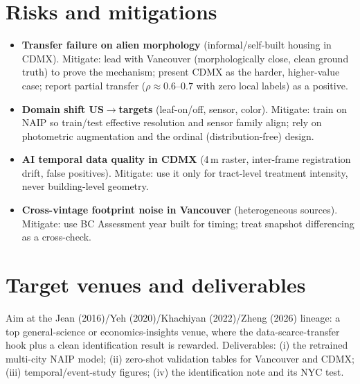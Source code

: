 \documentclass[11pt]{article}
\theoremstyle{plain}
\theoremstyle{remark}
\begin{document}
\section{Risks and mitigations}
\begin{itemize}[leftmargin=1.4em,itemsep=0.15em]
\item \textbf{Transfer failure on alien morphology} (informal/self-built housing in
CDMX). Mitigate: lead with Vancouver (morphologically close, clean ground truth) to
prove the mechanism; present CDMX as the harder, higher-value case; report partial
transfer ($\rho\!\approx\!0.6$--$0.7$ with zero local labels) as a positive.
\item \textbf{Domain shift US$\to$targets} (leaf-on/off, sensor, color). Mitigate:
train on NAIP so train/test effective resolution and sensor family align; rely on
photometric augmentation and the ordinal (distribution-free) design.
\item \textbf{AI temporal data quality in CDMX} (4\,m raster, inter-frame
registration drift, false positives). Mitigate: use it only for tract-level
treatment intensity, never building-level geometry.
\item \textbf{Cross-vintage footprint noise in Vancouver} (heterogeneous sources).
Mitigate: use BC Assessment year built for timing; treat snapshot differencing as a
cross-check.
\end{itemize}

\section{Target venues and deliverables}
Aim at the Jean (2016)/Yeh (2020)/Khachiyan (2022)/Zheng (2026) lineage: a
top general-science or economics-insights venue, where the data-scarce-transfer hook
plus a clean identification result is rewarded. Deliverables: (i) the retrained
multi-city NAIP model; (ii) zero-shot validation tables for Vancouver and CDMX;
(iii) temporal/event-study figures; (iv) the identification note and its NYC test.
\end{document}
